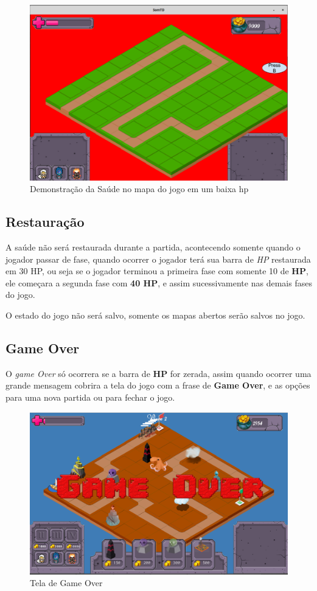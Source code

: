 \documentclass[11pt]{article} %
\begin{document}
\begin{figure}[!htp]
\centering
\includegraphics[scale=0.3]{res/danger.png}
\caption{Demonstração da Saúde no mapa do jogo em um baixa hp}
\label{Saúde}
\end{figure}

\subsection{Restauração}
A saúde não será restaurada durante a partida, acontecendo somente quando o jogador passar de fase, quando ocorrer o jogador terá sua barra de \textit{HP} restaurada em 30 HP, ou seja se o jogador terminou a primeira fase com somente 10 de \textbf{HP}, ele começara a segunda fase com \textbf{40 HP}, e assim sucessivamente nas demais fases do jogo.  

O estado do jogo não será salvo, somente os mapas abertos serão salvos no jogo.

\subsection{Game Over}
O \textit{game Over} só ocorrera se a barra de \textbf{HP} for zerada, assim quando ocorrer uma grande mensagem cobrira a tela do jogo com a frase de \textbf{Game Over}, e as opções para uma nova partida ou para fechar o jogo.

\begin{figure}[!htp]
\centering
\includegraphics[scale=0.3]{res/game_over.png}
\caption{Tela de Game Over}
\label{Game Over}
\end{figure}
\newpage
\end{document}

